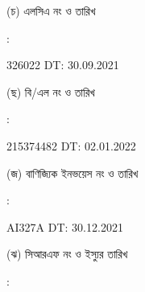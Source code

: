 \documentclass[12pt]{article}
\newcommand{\blno}{215374482}
\newcommand{\bldt}{02.01.2022}
\newcommand{\lcdt}{30.09.2021}
\newcommand{\lcano}{326022}
\newcommand{\lcadt}{\lcdt}
\newcommand{\invno}{AI327A}
\newcommand{\invdt}{30.12.2021}
\begin{document}
\begin{minipage}[t]{0.05\linewidth}
\hspace*{1em}
\end{minipage}
\begin{minipage}[t]{0.40\linewidth}
(চ) এলসিএ নং ও তারিখ
\end{minipage}
\begin{minipage}[t]{0.02\linewidth}
:
\end{minipage}
\begin{minipage}[t]{0.53\linewidth}
{\lcano} \hspace{2em} DT: {\lcadt}
\\
\end{minipage}
\begin{minipage}[t]{0.05\linewidth}
\hspace*{1em}
\end{minipage}
\begin{minipage}[t]{0.40\linewidth}
(ছ) বি/এল নং ও তারিখ
\end{minipage}
\begin{minipage}[t]{0.02\linewidth}
:
\end{minipage}
\begin{minipage}[t]{0.53\linewidth}
{\blno} \hspace{2em} DT: {\bldt}
\\
\end{minipage}
\begin{minipage}[t]{0.05\linewidth}
\hspace*{1em}
\end{minipage}
\begin{minipage}[t]{0.40\linewidth}
(জ) বাণিজ্যিক ইনভয়েস নং ও তারিখ
\end{minipage}
\begin{minipage}[t]{0.02\linewidth}
:
\end{minipage}
\begin{minipage}[t]{0.53\linewidth}
{\invno} \hspace{2em} DT: {\invdt}
\\
\end{minipage}
\begin{minipage}[t]{0.05\linewidth}
\hspace*{1em}
\end{minipage}
\begin{minipage}[t]{0.40\linewidth}
(ঝ) সিআরএফ নং ও ইস্যুর তারিখ
\end{minipage}
\begin{minipage}[t]{0.02\linewidth}
:
\end{minipage}
\end{document}
